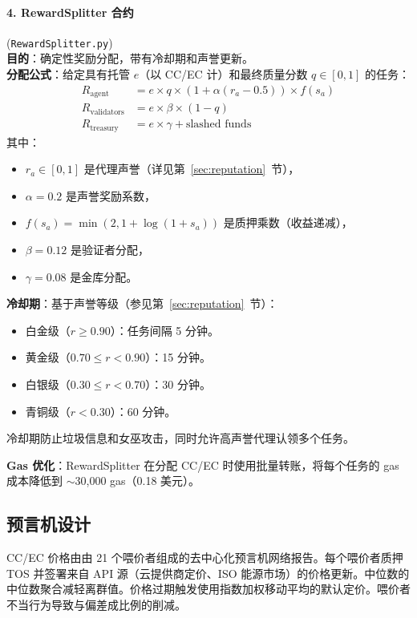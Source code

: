 \documentclass[11pt]{article}
\begin{document}
\paragraph{4. RewardSplitter 合约} (\texttt{RewardSplitter.py})\\
\textbf{目的}：确定性奖励分配，带有冷却期和声誉更新。\\
\textbf{分配公式}：给定具有托管 $e$（以 CC/EC 计）和最终质量分数 $q \in [0,1]$ 的任务：
\begin{align}
R_{\text{agent}} &= e \times q \times \left(1 + \alpha (r_a - 0.5)\right) \times f(s_a) \label{eq:reward-agent} \\
R_{\text{validators}} &= e \times \beta \times (1-q) \label{eq:reward-validators} \\
R_{\text{treasury}} &= e \times \gamma + \text{slashed funds} \label{eq:reward-treasury}
\end{align}
其中：
\begin{itemize}[noitemsep]
  \item $r_a \in [0,1]$ 是代理声誉（详见第~\ref{sec:reputation}~节），
  \item $\alpha = 0.2$ 是声誉奖励系数，
  \item $f(s_a) = \min(2, 1 + \log(1+s_a))$ 是质押乘数（收益递减），
  \item $\beta = 0.12$ 是验证者分配，
  \item $\gamma = 0.08$ 是金库分配。
\end{itemize}
\textbf{冷却期}：基于声誉等级（参见第~\ref{sec:reputation}~节）：
\begin{itemize}[noitemsep]
  \item 白金级（$r \geq 0.90$）：任务间隔 5 分钟。
  \item 黄金级（$0.70 \leq r < 0.90$）：15 分钟。
  \item 白银级（$0.30 \leq r < 0.70$）：30 分钟。
  \item 青铜级（$r < 0.30$）：60 分钟。
\end{itemize}
冷却期防止垃圾信息和女巫攻击，同时允许高声誉代理认领多个任务。

\textbf{Gas 优化}：RewardSplitter 在分配 CC/EC 时使用批量转账，将每个任务的 gas 成本降低到 $\sim$30,000 gas（0.18 美元）。

\subsection{预言机设计}
CC/EC 价格由由 21 个喂价者组成的去中心化预言机网络报告。每个喂价者质押 TOS 并签署来自 API 源（云提供商定价、ISO 能源市场）的价格更新。中位数的中位数聚合减轻离群值。价格过期触发使用指数加权移动平均的默认定价。喂价者不当行为导致与偏差成比例的削减。
\end{document}
